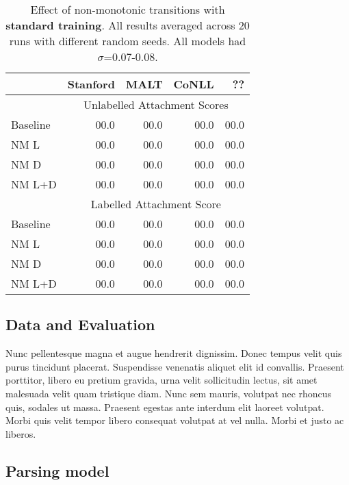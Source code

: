 \documentclass[11pt,letterpaper]{article}
\begin{document}
\begin{table}[t]
    \small
    \centering
    \begin{tabular}{l|rrrr}
        \hline
                              & Stanford & MALT & CoNLL & ?? \\
        \hline \hline
                              & \multicolumn{4}{c}{Unlabelled Attachment Scores} \\
        \hline
        Baseline              &  00.0  & 00.0 & 00.0 & 00.0   \\
        NM L                  &  00.0  & 00.0 & 00.0 & 00.0   \\
        NM D                  &  00.0  & 00.0 & 00.0 & 00.0   \\
        NM L+D                &  00.0  & 00.0 & 00.0 & 00.0    \\ 
        \hline
                              & \multicolumn{4}{c}{Labelled Attachment Score} \\
        \hline
        Baseline              &  00.0  & 00.0 & 00.0  & 00.0   \\
        NM L                  &  00.0  & 00.0 & 00.0  & 00.0   \\
        NM D                  &  00.0  & 00.0 & 00.0  & 00.0   \\
        NM L+D                &  00.0  & 00.0 & 00.0  & 00.0   \\ 
        \hline
    \end{tabular}
    \caption{\small Effect of non-monotonic transitions with \textbf{standard training}.
             All results averaged across 20 runs with different random seeds. All models
             had $\sigma$=0.07-0.08.\label{tab:standard}}
\end{table}


\subsection{Data and Evaluation}

Nunc pellentesque magna et augue hendrerit dignissim. Donec tempus velit quis purus tincidunt placerat. Suspendisse venenatis aliquet elit id convallis. Praesent porttitor, libero eu pretium gravida, urna velit sollicitudin lectus, sit amet malesuada velit quam tristique diam. Nunc sem mauris, volutpat nec rhoncus quis, sodales ut massa. Praesent egestas ante interdum elit laoreet volutpat. Morbi quis velit tempor libero consequat volutpat at vel nulla. Morbi et justo ac liberos.

\subsection{Parsing model}
\end{document}
